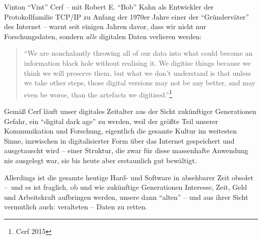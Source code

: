 \documentclass[a4paper,
fontsize=11pt,
oneside,
numbers=noperiodatend,
parskip=half-,
bibliography=totoc,
final
]{scrartcl}
\begin{document}
Vinton \enquote{Vint} Cerf -- mit Robert E. \enquote{Bob} Kahn als
Entwickler der Protokollfamilie TCP/IP zu Anfang der 1970er Jahre einer
der \enquote{Gründerväter} des Internet -- warnt seit einigen Jahren
davor, dass wir nicht nur Forschungsdaten, sondern \emph{alle} digitalen
Daten verlieren werden:

\begin{quote}
\enquote{We are nonchalantly throwing all of our data into what could
become an information black hole without realising it. We digitise
things because we think we will preserve them, but what we don't
understand is that unless we take other steps, those digital versions
may not be any better, and may even be worse, than the artefacts we
digitised.}\footnote{Cerf 2015}
\end{quote}

Gemäß Cerf läuft unser digitales Zeitalter aus der Sicht zukünftiger
Generationen Gefahr, ein \enquote{digital dark age} zu werden, weil der
größte Teil unserer Kommunikation und Forschung, eigentlich die gesamte
Kultur im weitesten Sinne, inzwischen in digitalisierter Form über das
Internet gespeichert und ausgetauscht wird -- einer Struktur, die zwar
für diese massenhafte Anwendung nie ausgelegt war, sie bis heute aber
erstaunlich gut bewältigt.

Allerdings ist die gesamte heutige Hard- und Software in absehbarer Zeit
obsolet --~und es ist fraglich, ob und wie zukünftige Generationen
Interesse, Zeit, Geld und Arbeitskraft aufbringen werden, unsere dann
\enquote{alten} -- und aus ihrer Sicht vermutlich auch: veralteten --
Daten zu retten.
\end{document}
